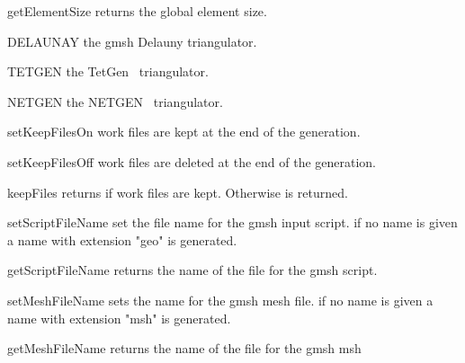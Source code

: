 \begin{methoddesc}[Design]{getElementSize}{}
returns the global element size.
\end{methoddesc}

\begin{memberdesc}[Design]{DELAUNAY}
the gmsh Delauny triangulator.
\end{memberdesc}

\begin{memberdesc}[Design]{TETGEN}
the TetGen~\cite{TETGEN} triangulator.
\end{memberdesc}

\begin{memberdesc}[Design]{NETGEN}
the NETGEN~\cite{NETGEN} triangulator.
\end{memberdesc}

\begin{methoddesc}[Design]{setKeepFilesOn}{}
work files are kept at the end of the generation.
\end{methoddesc}

\begin{methoddesc}[Design]{setKeepFilesOff}{}
work files are deleted at the end of the generation.
\end{methoddesc}

\begin{methoddesc}[Design]{keepFiles}{}
returns \True if work files are kept. Otherwise \False is returned.
\end{methoddesc}

\begin{methoddesc}[Design]{setScriptFileName}{}
set the file name for the gmsh input script. if no name is given a name with extension "geo" is generated.
\end{methoddesc}

\begin{methoddesc}[Design]{getScriptFileName}{}
returns the name of the file for the gmsh script.
\end{methoddesc}


\begin{methoddesc}[Design]{setMeshFileName}{}
sets the name for the gmsh  mesh file. if no name is given a name with extension "msh" is generated.
\end{methoddesc}

\begin{methoddesc}[Design]{getMeshFileName}{}
returns the name of the file for the gmsh msh
\end{methoddesc}



